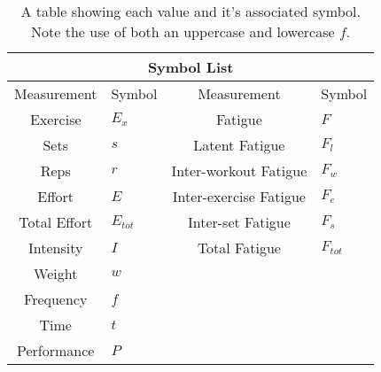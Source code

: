 \begin{table}[h]
	\centering
    \begin{tabular}{|c|l||c|l|}
	    	\hline
	    \multicolumn{4}{|c|}{Symbol List} \\
	    \hline
        Measurement & Symbol & Measurement & Symbol\\
        \hline
        Exercise & $E_x$ & Fatigue & $F$ \\
        Sets & $s$ & Latent Fatigue & $F_l$ \\
        Reps & $r$ & Inter-workout Fatigue & $F_w$ \\
        Effort & $E$ & Inter-exercise Fatigue & $F_e$ \\
        Total Effort & $E_{tot}$ & Inter-set Fatigue & $F_s$ \\
        Intensity & $I$ & Total Fatigue & $F_{tot}$ \\
        Weight & $w$  & & \\
        Frequency & $f$ & & \\
        Time & $t$ & & \\
        Performance & $P$ & & \\
        \hline
    \end{tabular}
    \caption{A table showing each value and it's associated symbol. Note the use of both an uppercase and lowercase $f$.}
    \label{tab:SymbolTable}
\end{table}
